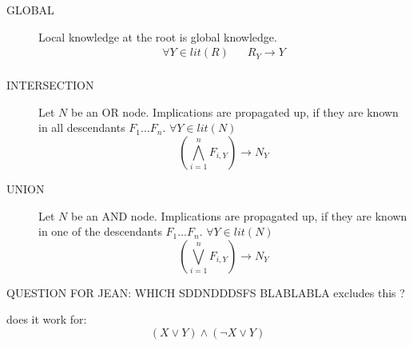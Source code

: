 \documentclass[10pt,twocolumn]{article}
\newcommand{\TODO}[1]{\textcolor[rgb]{1.00,0.00,0.00}{#1} }
\begin{document}
  \begin{description}  
  \item[GLOBAL] Local knowledge at the root is global knowledge. 
    \begin{align*}
    \forall Y \in lit(R) &\;\;\; R_Y \rightarrow  Y\\
    \end{align*}  
  \item[INTERSECTION] Let $N$ be an OR node. Implications are propagated up, if they are known in 
all descendants $F_1 \ldots F_n$. $\forall Y \in lit(N)$ 
    \[
    \left(\bigwedge_{i=1}^n F_{i,Y}\right) \rightarrow N_Y
    \]  
  \item[UNION] Let $N$ be an AND node. Implications are propagated up, if they are known in one of the descendants $F_1 \ldots F_n$. $\forall Y \in lit(N)$ 
    \[
    \left(\bigvee_{i=1}^n F_{i,Y}\right) \rightarrow N_Y
    \]  
\end{description}

\TODO{QUESTION FOR JEAN: WHICH SDDNDDDSFS BLABLABLA excludes this ? }
\begin{example}
does it work for: 
\[
(X \vee Y) \wedge (\neg X \vee Y)
\]

\end{example}
\end{document}
